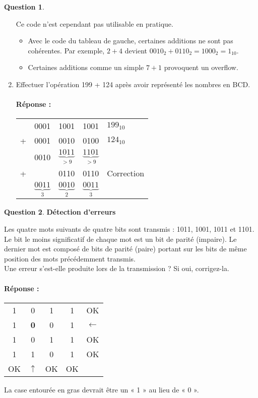 \documentclass[11pt,a4paper]{article}
\theoremstyle{definition}%
\newtheorem{Q}{Question}[] %
\newcommand{\reponse}[1]{%
	\ifthenelse {\boolean{corrige}} {\paragraph{Réponse :} \color{darkblue}   #1\color{black}} {}
 }
\begin{document}
\begin{Q}
\begin{enumerate}
{	Ce code n'est cependant pas utilisable en pratique.
	\begin{itemize}
		\item Avec le code du tableau de gauche, certaines additions ne sont pas cohérentes.
		Par exemple, $2+4$ devient $0010_2 + 0110_2 = 1000_2 = 1_{10}$.
		\item Certaines additions comme un simple $7+1$ provoquent un overflow.
	\end{itemize}
	}

	\item Effectuer l'opération 199 + 124 après avoir représenté les nombres en BCD.
	\reponse{
	\begin{center}
		\begin{tabular}{cccc|l}
		  & 0001 & 1001 & 1001 & $199_{10}$ \\
		+ & 0001 & 0010 & 0100 & $124_{10}$ \\ \hline
		  & 0010 & $\underbrace{1011}_{>9}$ & $\underbrace{1101}_{>9}$ & \\
		+ &      & 0110 & 0110 & Correction \\ \hline
		  & $\underbrace{0011}_{3}$ & $\underbrace{0010}_{2}$ & $\underbrace{0011}_{3}$ & \\
		\end{tabular}
	\end{center}
	}
\end{enumerate}
\end{Q}








\begin{Q}
\textbf{Détection d'erreurs}

Les quatre mots suivants de quatre bits sont transmis : 1011, 1001, 1011 et 1101.
Le bit le moins significatif de chaque mot est un bit de parité (impaire). %
Le dernier mot est composé de bits de parité (paire) portant sur les bits de même position des mots précédemment transmis.\\
Une erreur s'est-elle produite lors de la transmission ?
Si oui, corrigez-la.

\reponse{
\begin{center}
	\begin{tabular}{ccccl}\cline{4-4}
	1 & 0 & 1 & \multicolumn{1}{|c|}{1} & OK \\ \cline{2-2}
	1 & \multicolumn{1}{|c|}{\textbf{0}} & 0 & \multicolumn{1}{|c|}{1} & $\leftarrow$ \\ \cline{2-2}
	1 & 0 & 1 & \multicolumn{1}{|c|}{1} & OK \\ \cline{1-4}
	\multicolumn{1}{|c}{1} & 1 & 0 & \multicolumn{1}{|c|}{1} & OK \\ \cline{1-4}
	OK & $\uparrow$ & OK & OK & \\
	\end{tabular}
\end{center}

La case entourée en gras devrait être un « 1 » au lieu de « 0 ».
}

\end{Q}
\end{document}
